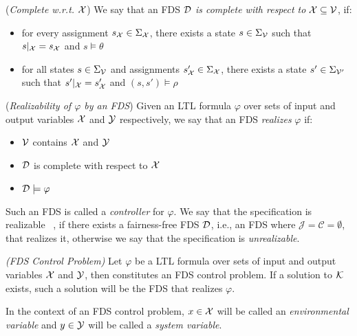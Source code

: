 \begin{definition}
	\label{def:complete_fds} (\emph{Complete w.r.t.} ${\mathcal{X}}$)
	We say that an FDS $\mathcal{D}$ \emph{is complete with respect to} ${\mathcal{X}} \subseteq {\ensuremath{\mathcal{V}}}$, if:
	\begin{itemize}
		\item for every assignment $s_{{\mathcal{X}}} \in \Sigma_{{\mathcal{X}}}$, there exists a state $s \in \Sigma_{{\mathcal{V}}}$ such that $s|_{{\mathcal{X}}} = s_{{\mathcal{X}}}$ and $s \models \theta$
		\item for all states $s \in \Sigma_{{\mathcal{V}}}$ and assignments $s'_{{\mathcal{X}}} \in \Sigma_{{\mathcal{X}}}$, there exists a state $s' \in \Sigma_{{\mathcal{V}}'}$ such that $s'|_{{\mathcal{X}}}=s'_{{\mathcal{X}}}$ and $(s,s') \models \rho$
	\end{itemize}
\end{definition}

\begin{definition}
	\label{def:fds_realizability} (\emph{Realizability of $\varphi$ by an FDS})
	Given an LTL formula $\varphi$ over sets of input and output variables ${\mathcal{X}}$ and ${\mathcal{Y}}$ respectively, we say that an FDS \fdsDef \emph{realizes} $\varphi$ if:
	\begin{itemize}
		\item ${\mathcal{V}}$ contains ${\mathcal{X}}$ and ${\mathcal{Y}}$ 
		\item $\mathcal{D}$ is complete with respect to ${\mathcal{X}}$
		\item $\mathcal{D} \models \varphi$
	\end{itemize}
	Such an FDS is called a \emph{controller} for $\varphi$. We say that the specification is realizable ~\cite{pnueli1989synthesis}, if there exists a fairness-free FDS $\mathcal{D}$, i.e., an FDS where $\mathcal{J} =\mathcal{C} = \emptyset$, that realizes it, otherwise we say that the specification is \emph{unrealizable}.
\end{definition}

\begin{definition}
	\label{def:fds_control_problem} \emph{(FDS Control Problem)} 
	Let $\varphi$ be a LTL formula over sets of input and output variables ${\mathcal{X}}$ and ${\mathcal{Y}}$, then \fdsControlProblemDef constitutes an FDS control problem. If a solution to $\mathcal{K}$ exists, such a solution will be the FDS \fdsDef that realizes $\varphi$.
\end{definition}
In the context of an FDS control problem, $x \in {\ensuremath{\mathcal{X}}}$ will be called an \emph{environmental variable} and $y \in {\ensuremath{\mathcal{Y}}}$ will be called a \emph{system variable}.